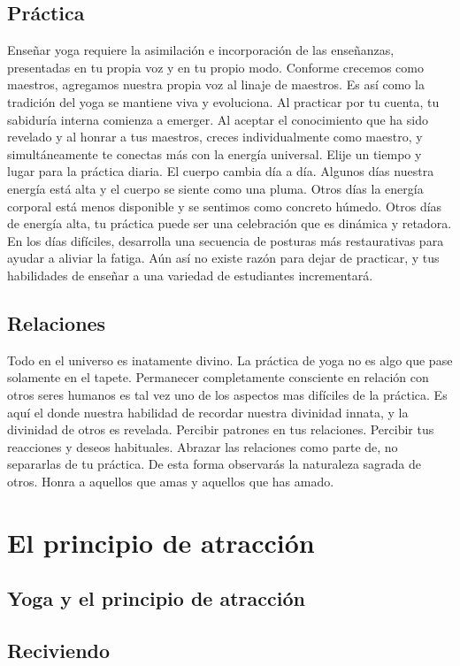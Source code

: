 \subsection{Práctica}
Enseñar yoga requiere la asimilación e incorporación de las enseñanzas, presentadas en tu propia voz y en tu propio modo. Conforme crecemos como maestros, agregamos nuestra propia voz al linaje de maestros. Es así como la tradición del yoga se mantiene viva y evoluciona. Al practicar por tu cuenta, tu sabiduría interna comienza a emerger. Al aceptar el conocimiento que ha sido revelado y al honrar a tus maestros, creces individualmente como maestro, y simultáneamente te conectas más con la energía universal. Elije un tiempo y lugar para la práctica diaria. El cuerpo cambia día a día. Algunos días nuestra energía está alta y el cuerpo se siente como una pluma. Otros días la energía corporal está menos disponible y se sentimos como concreto húmedo. Otros días de energía alta, tu práctica puede ser una celebración que es dinámica y retadora. En los días difíciles, desarrolla una secuencia de posturas más restaurativas para ayudar a aliviar la fatiga. Aún así no existe razón para dejar de practicar, y tus habilidades de enseñar a una variedad de estudiantes incrementará.

\subsection{Relaciones}
Todo en el universo es inatamente divino. La práctica de yoga no es algo que pase solamente en el tapete. Permanecer completamente consciente en relación con otros seres humanos es tal vez uno de los aspectos mas difíciles de la práctica. Es aquí el donde nuestra habilidad de recordar nuestra divinidad innata, y la divinidad de otros es revelada. Percibir patrones en tus relaciones. Percibir tus reacciones y deseos habituales. Abrazar las relaciones como parte de, no separarlas de tu práctica. De esta forma observarás la naturaleza sagrada de otros. Honra a aquellos que amas y aquellos que has amado.

\section{El principio de atracción}
\subsection{Yoga y el principio de atracción}
\subsection{Reciviendo}
